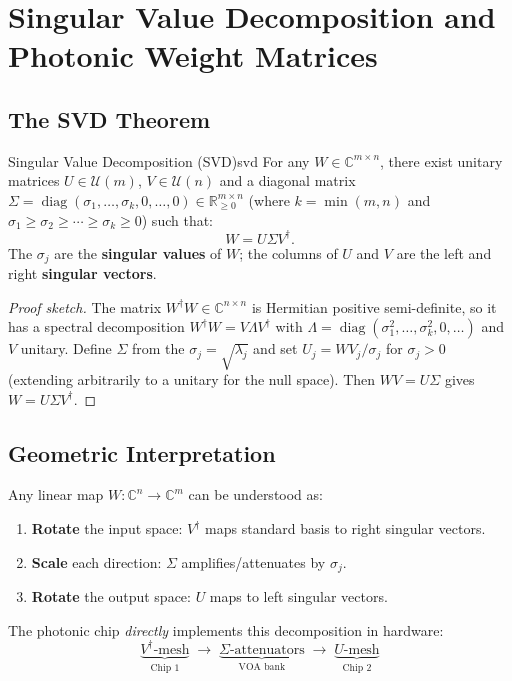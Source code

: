 \documentclass[12pt, a4paper]{article}
\newcommand{\CC}{\mathbb{C}}
\newcommand{\RR}{\mathbb{R}}
\newcommand{\calU}{\mathcal{U}}
\newcommand{\diag}{\operatorname{diag}}
\begin{document}
\section{Singular Value Decomposition and Photonic Weight Matrices}
\label{sec:svd}

\subsection{The SVD Theorem}

\begin{theorem}{Singular Value Decomposition (SVD)}{svd}
  For any $W\in\CC^{m\times n}$, there exist unitary matrices
  $U\in\calU(m)$, $V\in\calU(n)$ and a diagonal matrix
  $\Sigma = \diag(\sigma_1,\ldots,\sigma_k,0,\ldots,0)\in\RR^{m\times n}_{\geq0}$
  (where $k=\min(m,n)$ and $\sigma_1\geq\sigma_2\geq\cdots\geq\sigma_k\geq0$)
  such that:
  \begin{equation}
    W = U\Sigma V^\dagger.
    \label{eq:svd}
  \end{equation}
  The $\sigma_j$ are the \textbf{singular values} of $W$;
  the columns of $U$ and $V$ are the left and right \textbf{singular vectors}.
\end{theorem}
\begin{proof}[Proof sketch]
  The matrix $W^\dagger W\in\CC^{n\times n}$ is Hermitian positive semi-definite,
  so it has a spectral decomposition $W^\dagger W = V\Lambda V^\dagger$ with
  $\Lambda = \diag(\sigma_1^2,\ldots,\sigma_k^2,0,\ldots)$ and $V$ unitary.
  Define $\Sigma$ from the $\sigma_j = \sqrt{\lambda_j}$ and set
  $U_j = W V_j / \sigma_j$ for $\sigma_j > 0$ (extending arbitrarily to a
  unitary for the null space).
  Then $WV = U\Sigma$ gives $W=U\Sigma V^\dagger$.
\end{proof}

\subsection{Geometric Interpretation}

Any linear map $W:\CC^n\to\CC^m$ can be understood as:
\begin{enumerate}
  \item \textbf{Rotate} the input space: $V^\dagger$ maps standard basis to
    right singular vectors.
  \item \textbf{Scale} each direction: $\Sigma$ amplifies/attenuates by $\sigma_j$.
  \item \textbf{Rotate} the output space: $U$ maps to left singular vectors.
\end{enumerate}
The photonic chip \emph{directly} implements this decomposition in hardware:
\[
\underbrace{V^\dagger\text{-mesh}}_{\text{Chip 1}}
\;\longrightarrow\;
\underbrace{\Sigma\text{-attenuators}}_{\text{VOA bank}}
\;\longrightarrow\;
\underbrace{U\text{-mesh}}_{\text{Chip 2}}
\]
\end{document}
